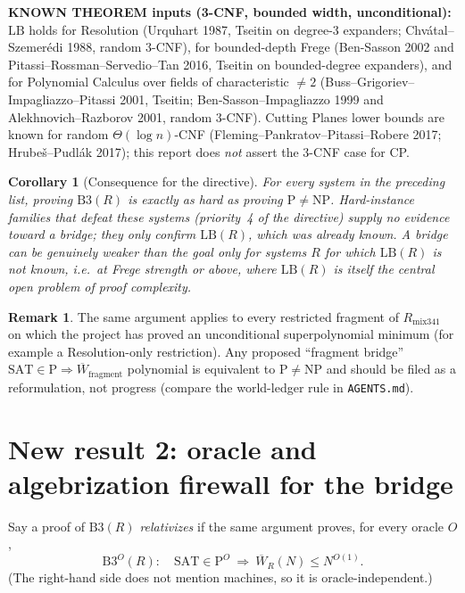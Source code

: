 \documentclass[11pt]{article}
\newtheorem{corollary}[theorem]{Corollary}
\theoremstyle{definition}
\newtheorem{remark}[theorem]{Remark}
\newcommand{\Wbar}{\overline W}
\begin{document}
\noindent\textbf{KNOWN THEOREM inputs (3-CNF, bounded width, unconditional):} $\mathrm{LB}$ holds for Resolution (Urquhart 1987, Tseitin on degree-3 expanders; Chv\'atal--Szemer\'edi 1988, random 3-CNF), for bounded-depth Frege (Ben-Sasson 2002 and Pitassi--Rossman--Servedio--Tan 2016, Tseitin on bounded-degree expanders), and for Polynomial Calculus over fields of characteristic $\ne2$ (Buss--Grigoriev--Impagliazzo--Pitassi 2001, Tseitin; Ben-Sasson--Impagliazzo 1999 and Alekhnovich--Razborov 2001, random 3-CNF). Cutting Planes lower bounds are known for random $\Theta(\log n)$-CNF (Fleming--Pankratov--Pitassi--Robere 2017; Hrube\v{s}--Pudl\'ak 2017); this report does \emph{not} assert the 3-CNF case for CP.

\begin{corollary}[Consequence for the directive]
For every system in the preceding list, proving $\mathrm{B3}(R)$ is \emph{exactly as hard as proving} $\mathrm{P}\ne\mathrm{NP}$. Hard-instance families that defeat these systems (priority~4 of the directive) supply no evidence toward a bridge; they only confirm $\mathrm{LB}(R)$, which was already known. A bridge can be genuinely weaker than the goal only for systems $R$ for which $\mathrm{LB}(R)$ is \emph{not} known, i.e.\ at Frege strength or above, where $\mathrm{LB}(R)$ is itself the central open problem of proof complexity.
\end{corollary}

\begin{remark}
The same argument applies to every restricted fragment of $R_{\mathrm{mix341}}$ on which the project has proved an unconditional superpolynomial minimum (for example a Resolution-only restriction). Any proposed ``fragment bridge'' $\mathrm{SAT}\in\mathrm{P}\Rightarrow\Wbar_{\text{fragment}}$ polynomial is equivalent to $\mathrm{P}\ne\mathrm{NP}$ and should be filed as a reformulation, not progress (compare the world-ledger rule in \texttt{AGENTS.md}).
\end{remark}

\section{New result 2: oracle and algebrization firewall for the bridge}
Say a proof of $\mathrm{B3}(R)$ \emph{relativizes} if the same argument proves, for every oracle $O$,
\[
\mathrm{B3}^O(R):\quad \mathrm{SAT}\in\mathrm{P}^O\ \Longrightarrow\ \Wbar_R(N)\le N^{O(1)}.
\]
(The right-hand side does not mention machines, so it is oracle-independent.)
\end{document}
